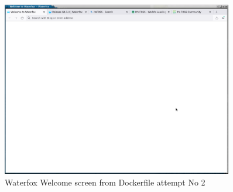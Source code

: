 %

\begin{figure}[!h]
  \centering
   \includegraphics[width=0.9\textwidth]{welcom.png}
  \caption{Waterfox Welcome screen from Dockerfile attempt No 2}
  \label{fig:welcom}
\end{figure}

%

